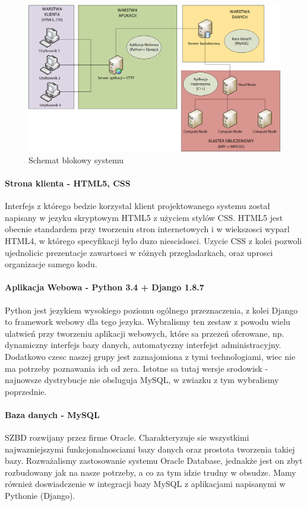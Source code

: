 \documentclass{article}
\begin{document}
\begin{figure}[h]
    \centering
    \includegraphics[width=1.0\textwidth]{schemat_blokowy_systemu.png}
    \caption{Schemat blokowy systemu}
    \label{fig:schemat}
\end{figure}

\paragraph{Strona klienta - HTML5, CSS}
Interfejs z którego bedzie korzystal klient projektowanego systemu został napisany w jezyku skryptowym HTML5 z użyciem stylów CSS. HTML5 jest obecnie standardem przy tworzeniu stron internetowych i w wiekszosci wyparl HTML4, w którego specyfikacji bylo duzo niescislosci. Uzycie CSS z kolei pozwoli ujednolicic prezentacje zawartosci w różnych przegladarkach, oraz uprosci organizacje samego kodu.

\paragraph{Aplikacja Webowa - Python 3.4 + Django 1.8.7\cite{django}}
Python jest jezykiem wysokiego poziomu ogólnego przeznaczenia, z kolei Django to framework webowy dla tego jezyka. Wybralismy ten zestaw z powodu wielu ulatwień przy tworzeniu aplikacji webowych, które sa przezeń oferowane, np. dynamiczny interfejs bazy danych, automatyczny interfejst administracyjny. Dodatkowo czesc naszej grupy jest zaznajomiona z tymi technologiami, wiec nie ma potrzeby poznawania ich od zera. Istotne sa tutaj wersje srodowisk - najnowsze dystrybucje nie obsluguja MySQL, w zwiazku z tym wybralismy poprzednie.

\paragraph{Baza danych - MySQL}
SZBD rozwijany przez firme Oracle. Charakteryzuje sie wszystkimi najwazniejszymi funkcjonalnosciami bazy danych oraz prostota tworzenia takiej bazy. Rozważalismy zastosowanie systemu Oracle Database, jednakże jest on zbyt rozbudowany jak na nasze potrzeby, a co za tym idzie trudny w obsudze. Mamy również doswiadczenie w integracji bazy MySQL z aplikacjami napisanymi w Pythonie (Django).
\end{document}
